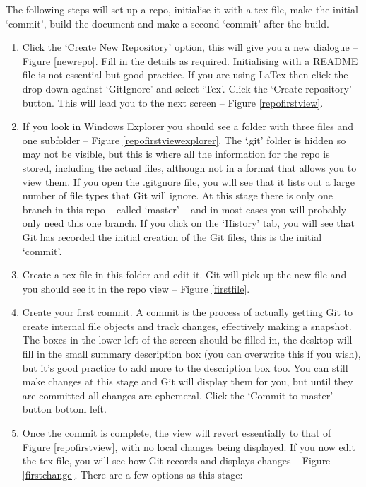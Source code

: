 \documentclass[a4paper, 12pt]{article}
\begin{document}
The following steps will set up a repo, initialise it with a tex file, make the initial `commit', build the document and make a second `commit' after the build.
\begin{enumerate}
\item Click the `Create New Repository' option, this will give you a new dialogue -- Figure \ref{newrepo}. Fill in the details as required. Initialising with a README file is not essential but good practice. If you are using LaTex then click the drop down against `GitIgnore' and select `Tex'. Click the `Create repository' button. This will lead you to the next screen -- Figure \ref{repofirstview}.
\item If you look in Windows Explorer you should see a folder with three files and one subfolder -- Figure \ref{repofirstviewexplorer}. The `.git' folder is hidden so may not be visible, but this is where all the information for the repo is stored, including the actual files, although not in a format that allows you to view them. If you open the .gitgnore file, you will see that it lists out a large number of file types that Git will ignore. At this stage there is only one branch in this repo -- called `master' -- and in most cases you will probably only need this one branch. If you click on the `History' tab, you will see that Git has recorded the initial creation of the Git files, this is the initial `commit'.
\item Create a tex file in this folder and edit it. Git will pick up the new file and you should see it in the repo view -- Figure \ref{firstfile}. 
\item Create your first commit. A commit is the process of actually getting Git to create internal file objects and track changes, effectively making a snapshot. The boxes in the lower left of the screen should be filled in, the desktop will fill in the small summary description box (you can overwrite this if you wish), but it's good practice to add more to the description box too. You can still make changes at this stage and Git will display them for you, but until they are committed all changes are ephemeral. Click the `Commit to master' button bottom left.
\item Once the commit is complete, the view will revert essentially to that of Figure \ref{repofirstview}, with no local changes being displayed. If you now edit the tex file, you will see how Git records and displays changes -- Figure \ref{firstchange}. There are a few options as this stage:
\begin{itemize}

\end{itemize}
\end{enumerate}
\end{document}
